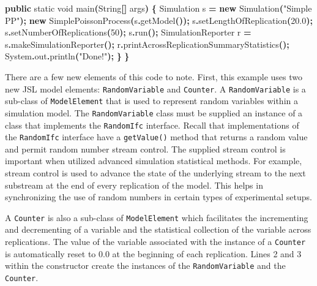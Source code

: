 \documentclass[
]{book}
\newenvironment{Shaded}{\begin{snugshade}}{\end{snugshade}}
\newcommand{\BuiltInTok}[1]{#1}
\newcommand{\DataTypeTok}[1]{\textcolor[rgb]{0.13,0.29,0.53}{#1}}
\newcommand{\DecValTok}[1]{\textcolor[rgb]{0.00,0.00,0.81}{#1}}
\newcommand{\FloatTok}[1]{\textcolor[rgb]{0.00,0.00,0.81}{#1}}
\newcommand{\FunctionTok}[1]{\textcolor[rgb]{0.00,0.00,0.00}{#1}}
\newcommand{\KeywordTok}[1]{\textcolor[rgb]{0.13,0.29,0.53}{\textbf{#1}}}
\newcommand{\NormalTok}[1]{#1}
\newcommand{\OperatorTok}[1]{\textcolor[rgb]{0.81,0.36,0.00}{\textbf{#1}}}
\newcommand{\StringTok}[1]{\textcolor[rgb]{0.31,0.60,0.02}{#1}}
\theoremstyle{definition}
\theoremstyle{definition}
\theoremstyle{definition}
\theoremstyle{definition}
\theoremstyle{remark}
\begin{document}
\begin{Shaded}
\begin{Highlighting}[]
    \KeywordTok{public} \DataTypeTok{static} \DataTypeTok{void} \FunctionTok{main}\OperatorTok{(}\BuiltInTok{String}\OperatorTok{[]}\NormalTok{ args}\OperatorTok{)} \OperatorTok{\{}
\NormalTok{        Simulation s }\OperatorTok{=} \KeywordTok{new} \FunctionTok{Simulation}\OperatorTok{(}\StringTok{"Simple PP"}\OperatorTok{);}
        \KeywordTok{new} \FunctionTok{SimplePoissonProcess}\OperatorTok{(}\NormalTok{s}\OperatorTok{.}\FunctionTok{getModel}\OperatorTok{());}
\NormalTok{        s}\OperatorTok{.}\FunctionTok{setLengthOfReplication}\OperatorTok{(}\FloatTok{20.0}\OperatorTok{);}
\NormalTok{        s}\OperatorTok{.}\FunctionTok{setNumberOfReplications}\OperatorTok{(}\DecValTok{50}\OperatorTok{);}
\NormalTok{        s}\OperatorTok{.}\FunctionTok{run}\OperatorTok{();}
\NormalTok{        SimulationReporter r }\OperatorTok{=}\NormalTok{ s}\OperatorTok{.}\FunctionTok{makeSimulationReporter}\OperatorTok{();}
\NormalTok{        r}\OperatorTok{.}\FunctionTok{printAcrossReplicationSummaryStatistics}\OperatorTok{();}
        \BuiltInTok{System}\OperatorTok{.}\FunctionTok{out}\OperatorTok{.}\FunctionTok{println}\OperatorTok{(}\StringTok{"Done!"}\OperatorTok{);}
    \OperatorTok{\}}
\OperatorTok{\}}
\end{Highlighting}
\end{Shaded}

There are a few new elements of this code to
note. First, this example uses two new JSL model elements:
\texttt{RandomVariable} and \texttt{Counter}. A \texttt{RandomVariable} is a sub-class of
\texttt{ModelElement} that is used to represent random variables within a
simulation model. The \texttt{RandomVariable} class must be supplied an instance
of a class that implements the \texttt{RandomIfc} interface. Recall that
implementations of the \texttt{RandomIfc} interface have a \texttt{getValue()} method that
returns a random value and permit random number stream control. The
supplied stream control is important when utilized advanced simulation
statistical methods. For example, stream control is used to advance the
state of the underlying stream to the next substream at the end of every
replication of the model. This helps in synchronizing the use of random
numbers in certain types of experimental setups.

A \texttt{Counter} is also a sub-class of \texttt{ModelElement} which facilitates the incrementing and
decrementing of a variable and the statistical collection of the
variable across replications. The value of the variable associated with
the instance of a \texttt{Counter} is automatically reset to 0.0 at the beginning
of each replication. Lines 2 and 3 within the constructor create the
instances of the \texttt{RandomVariable} and the \texttt{Counter}.
\end{document}
